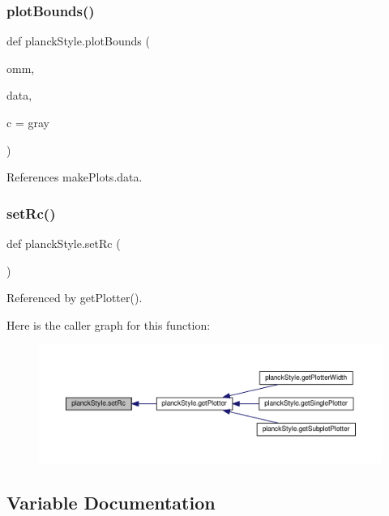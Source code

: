 \subsubsection{\texorpdfstring{plot\+Bounds()}{plotBounds()}}
{\footnotesize\ttfamily def planck\+Style.\+plot\+Bounds (\begin{DoxyParamCaption}\item[{}]{omm,  }\item[{}]{data,  }\item[{}]{c = {\ttfamily \textquotesingle{}gray\textquotesingle{}} }\end{DoxyParamCaption})}



References make\+Plots.\+data.

\mbox{\label{namespaceplanckStyle_aea86929d119e85a442591b8ab77b2c5b}} 
\subsubsection{\texorpdfstring{set\+Rc()}{setRc()}}
{\footnotesize\ttfamily def planck\+Style.\+set\+Rc (\begin{DoxyParamCaption}{ }\end{DoxyParamCaption})}



Referenced by get\+Plotter().

Here is the caller graph for this function\+:
\nopagebreak
\begin{figure}[H]
\begin{center}
\leavevmode
\includegraphics[width=350pt]{namespaceplanckStyle_aea86929d119e85a442591b8ab77b2c5b_icgraph}
\end{center}
\end{figure}


\subsection{Variable Documentation}
\mbox{\label{namespaceplanckStyle_a6cc22705c207a353d63ab7ce94bb5569}} 
